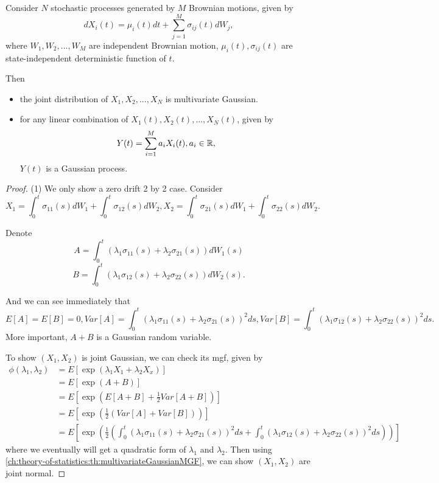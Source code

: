 \begin{refsection}
\begin{theorem}\label{ch:theory-of-stochastic-process:th:linearCombinationOfBrownianMotionGeneratedGaussainProcess}
Consider $N$ stochastic processes generated by $M$ Brownian motions, given by
$$dX_i(t) = \mu_i(t) dt + \sum_{j=1}^M \sigma_{ij}(t) dW_j,$$
where $W_1,W_2,...,W_M$ are independent Brownian motion, $\mu_i(t), \sigma_{ij}(t)$ are state-independent deterministic function of $t$. 


Then 
\begin{itemize}
	\item the joint distribution of $X_1,X_2,...,X_N$ is multivariate Gaussian.
	\item for any linear combination of $X_1(t),X_2(t),...,X_N(t)$, given by
	$$Y(t) = \sum_{i=1}^M a_iX_i(t), a_i\in \mathbb{R},$$
	$Y(t)$ is a Gaussian process. 
\end{itemize}
\end{theorem}
\begin{proof}
(1) We only show a zero drift 2 by 2 case.
Consider 
$$X_1 = \int_0^t \sigma_{11}(s) dW_1 + \int_0^t \sigma_{12}(s)dW_2, X_2 = \int_0^t \sigma_{21}(s)dW_1 + \int_0^t \sigma_{22}(s) dW_2.$$

Denote
$$A = \int_0^t (\lambda_1 \sigma_{11}(s) + \lambda_2 \sigma_{21}(s)) dW_1(s)$$
$$B = \int_0^t (\lambda_1 \sigma_{12}(s) + \lambda_2 \sigma_{22}(s)) dW_2(s).$$

And we can see immediately that
$$E[A] = E[B] = 0, Var[A] = \int_0^t (\lambda_1 \sigma_{11}(s) + \lambda_2 \sigma_{21}(s))^2 ds, Var[B] = \int_0^t (\lambda_1 \sigma_{12}(s) + \lambda_2 \sigma_{22}(s))^2 ds.$$
More important, $A + B$ is a Gaussian random variable.

To show $(X_1,X_2)$ is joint Gaussian, we can check its mgf, given by
\begin{align*}
\phi(\lambda_1,\lambda_2)& = E[\exp(\lambda_1X_1+\lambda_2X_x)] \\
& = E[\exp(A + B)]\\
& = E[\exp(E[A+B] + \frac{1}{2}Var[A+B])] \\
& = E[\exp(\frac{1}{2}(Var[A] + Var[B]))] \\
& = E[\exp(\frac{1}{2}(\int_0^t (\lambda_1 \sigma_{11}(s) + \lambda_2 \sigma_{21}(s))^2 ds + \int_0^t (\lambda_1 \sigma_{12}(s) + \lambda_2 \sigma_{22}(s))^2 ds) )] 
\end{align*}
where we eventually will get a quadratic form of $\lambda_1$ and $\lambda_2$. Then using \autoref{ch:theory-of-statistics:th:multivariateGaussianMGF}, we can show $(X_1,X_2)$ are joint normal.


\end{proof}
\end{refsection}

